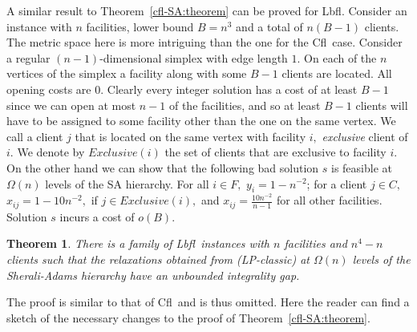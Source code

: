 \documentclass[11pt]{article}
\newtheorem{theorem}{Theorem}[section]
\newcommand{\lbfl}{{\sc Lbfl}}
\newcommand{\cfl}{{\sc Cfl}}
\begin{document}
A  similar result  to Theorem~\ref{cfl-SA:theorem}  can be  proved for
\lbfl\/. Consider an instance with $n$ facilities, lower bound $B=n^3$
and a total of $n(B-1)$ clients. The metric space here is more intriguing
than the one for the \cfl\ case. Consider a regular
$(n-1)$-dimensional 
simplex with
edge length $1.$  On each of  the $n$ vertices of the simplex  a facility along with
some $B-1$  clients are  located. All opening  costs are  $0.$ Clearly
every integer solution has a cost  of at least $B-1$ since we can open
at most  $n-1$ of the facilities,  and so at least  $B-1$ clients will
have to  be assigned to some facility  other than the one  on the same
vertex.  We call a client $j$  that is located on the same vertex with
facility   $i,$  \emph{exclusive}   client   of  $i$.   We  denote   by
$Exclusive(i)$ the set of clients  that are exclusive to facility $i$.
On the other hand we can  show that the following bad solution $s$ is
feasible at  $\Omega(n)$ levels of the  SA hierarchy. 
 For  all $i\in  F,$ $y_{i}=1-n^{-2}$; 
 for  a client $j\in  C,$ $x_{ij}=1-10n^{-2},$  if
$j \in Exclusive(i),$ and
$x_{ij}=\frac{10n^{-2}}{n-1}$  for   all  other  facilities.  Solution
$s$ incurs a cost of $o(B)$.

\begin{theorem}\label{lbfl-SA:theorem}
There is  a family of  \lbfl\   instances with $n$ facilities and $n^4-n$ clients  
such that the  relaxations  obtained from (LP-classic)  at $\Omega (n)$
levels of  the Sherali-Adams hierarchy have an unbounded integrality
gap. 
\end{theorem}

The proof  is similar to  that of \cfl\  and is thus omitted.  Here the
reader can  find a  sketch of  the necessary changes  to the  proof of
Theorem~\ref{cfl-SA:theorem}.
\end{document}
